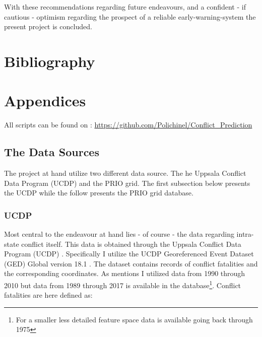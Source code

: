\documentclass[a4paper]{article}
\begin{document}
With these recommendations regarding future endeavours, and a confident - if cautious - optimism regarding the prospect of a reliable early-warning-system the present project is concluded.\par

\pagebreak

\section{Bibliography}
 


\pagebreak
\section{Appendices}

All scripts can be found on : \hyperlink{https://github.com/Polichinel/Conflict_Prediction}{https://github.com/Polichinel/Conflict\_Prediction}


\subsection{The Data Sources}\label{data_sources} %

The project at hand utilize two different data source. The he Uppsala Conflict Data Program (UCDP) \citep{Sundberg_2013, Croicu_Sundberg_2017} and the PRIO grid\citep{Tollefsen_2012}. The first subsection below presents the UCDP while the follow presents the PRIO grid database.\par

\subsubsection{UCDP}

Most central to the endeavour at hand lies - of course - the data regarding intra-state conflict itself. This data is obtained through the Uppsala Conflict Data Program (UCDP) \citep{Sundberg_2013, Croicu_Sundberg_2017}. Specifically I utilize the UCDP Georeferenced Event Dataset (GED) Global version 18.1 \citep{UCDP_2017}. The dataset contains records of conflict fatalities and the corresponding coordinates. As mentions I utilized data from 1990 through 2010 but data from 1989 through 2017 is available in the database\footnote{For a smaller less detailed feature space data is available going back through 1975}. Conflict fatalities are here defined as: 
\end{document}
